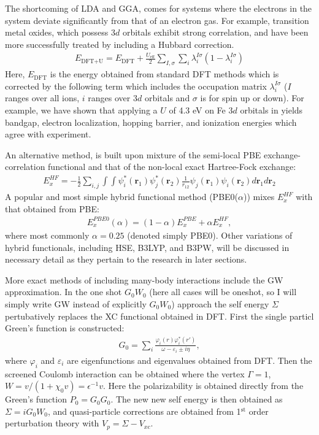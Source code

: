 The shortcoming of LDA and GGA, comes for systems where the electrons in the system deviate significantly from that of an electron gas. For example, transition metal oxides, which possess $3d$ orbitals exhibit strong correlation, and have been more successfully treated by including a Hubbard correction.~\cite{dudarev1998electron}
\begin{align}
    E_{\text{DFT}+\text{U}}=E_{\text{DFT}}+\frac{U_{\text{eff}}}{2}\sum_{I,\sigma}\sum_{i}\lambda_{i}^{I\sigma}(1-\lambda_{i}^{I\sigma})
    \label{intro:eq:U}
\end{align}
Here, $E_\text{DFT}$ is the energy obtained from standard DFT methods which is corrected by the following term which includes the occupation matrix $\lambda_i^{I\sigma}$ ($I$ ranges over all ions, $i$ ranges over $3d$ orbitals and $\sigma$ is for spin up or down). For example, we have shown that applying a $U$ of 4.3 eV on Fe $3d$ orbitals in  yields bandgap, electron localization, hopping barrier, and ionization energies which agree with experiment.~\cite{smart2017effect}

An alternative method, is built upon mixture of the semi-local PBE exchange-correlation functional and that of the non-local exact Hartree-Fock exchange:
\begin{align}
    E_x^{HF} = -\frac{1}{2} \sum_{i,j} \int\int \psi_i^*(\textbf{r}_1)\psi_j^*(\textbf{r}_2) \frac{1}{r_{12}} \psi_j(\textbf{r}_1)\psi_i(\textbf{r}_2) d\textbf{r}_1 d\textbf{r}_2
    \label{intro:eq:HF}
\end{align}
A popular and most simple hybrid functional method (PBE0($\alpha$)) mixes $E_x^{HF}$ with that obtained from PBE:
\begin{align}
    E_{x}^{PBE0}(\alpha) = (1-\alpha) E_x^{PBE} + \alpha E_x^{HF},
    \label{intro:eq:PBE0a}
\end{align}
where most commonly $\alpha=0.25$ (denoted simply PBE0). Other variations of hybrid functionals, including HSE, B3LYP, and B3PW, will be discussed in necessary detail as they pertain to the research in later sections.


More exact methods of including many-body interactions include the GW approximation. In the one shot $G_0W_0$ (here all cases will be oneshot, so I will simply write GW instead of explicitly $G_0W_0$) approach the self energy $\Sigma$ pertubatively replaces the XC functional obtained in DFT. First the single particl Green's function is constructed:
\begin{align}
    G_0 = \sum_i \frac{\varphi_i(r)\varphi_i^*(r')}{\omega-\varepsilon_i \pm i\eta },
    \label{intro:eq:g0}
\end{align}
where $\varphi_i$ and $\varepsilon_i$ are eigenfunctions and eigenvalues obtained from DFT. Then the screened Coulomb interaction can be obtained where the vertex $\Gamma = 1$, $W = v/(1+\chi_0 v) = \epsilon^{-1} v$. Here the polarizability is obtained directly from the Green's function $P_0=G_0G_0$. The new new self energy is then obtained as $\Sigma = iG_0W_0$, and quasi-particle corrections are obtained from 1$^\text{st}$ order perturbation theory with $V_p = \Sigma - V_{xc}$.



